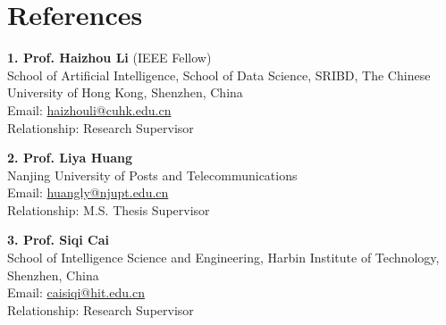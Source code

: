 \documentclass[letterpaper,10pt]{article}
\begin{document}
	\section{References}
	\begin{itemize}[leftmargin=0.15in, label={}]
		\small{\item{
				\textbf{1. Prof. Haizhou Li} (IEEE Fellow) \\
				School of Artificial Intelligence, School of Data Science, SRIBD, The Chinese University of Hong Kong, Shenzhen, China \\
				Email: \href{mailto:haizhouli@cuhk.edu.cn}{haizhouli@cuhk.edu.cn} \\
				Relationship: Research Supervisor
		}}
		
		\small{\item{
				\textbf{2. Prof. Liya Huang} \\
				Nanjing University of Posts and Telecommunications \\
				Email: \href{mailto:huangly@njupt.edu.cn}{huangly@njupt.edu.cn} \\
				Relationship: M.S. Thesis Supervisor
		}}
		
		\small{\item{
				\textbf{3. Prof. Siqi Cai} \\
				School of Intelligence Science and Engineering, Harbin Institute of Technology, Shenzhen, China \\
				Email: \href{mailto:caisiqi@hit.edu.cn}{caisiqi@hit.edu.cn} \\
				Relationship: Research Supervisor
		}}
	\end{itemize}
	
\end{document}
